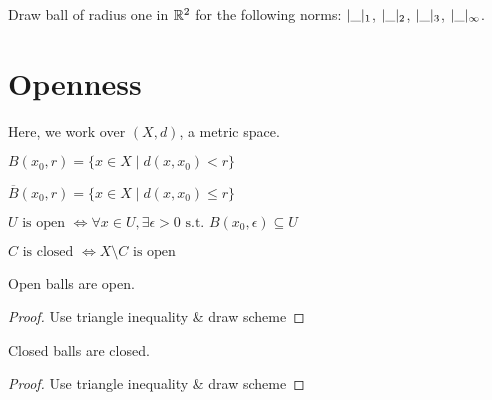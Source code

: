 \begin{question}
	Draw ball of radius one in $\mathbb{R}^2$ for the following norms: $| \_ |_1$, $| \_ |_2$, $| \_ |_3$, $| \_ |_{\infty}$.
\end{question}



\section{Openness}
Here, we work over $(X,d)$, a metric space.
\begin{definition}
	$B(x_0,r) = \{ x \in X \mid d(x,x_0)<r \}$
\end{definition}
\begin{definition}
	$\overline{B}(x_0,r) = \{ x \in X \mid d(x,x_0) \leq r \}$
\end{definition}
\begin{definition}
	$U \text{ is open } \iff \forall x \in U, \exists \epsilon>0 \text{ s.t. } B(x_0,\epsilon) \subseteq U$
\end{definition}
\begin{definition}
	$C \text{ is closed } \iff X \setminus C \text{ is open}$
\end{definition}
\begin{property}
	Open balls are open.
\end{property}
\begin{proof}
	Use triangle inequality \& draw scheme
\end{proof}
\begin{property}
	Closed balls are closed.
\end{property}
\begin{proof}
	Use triangle inequality \& draw scheme
\end{proof}

